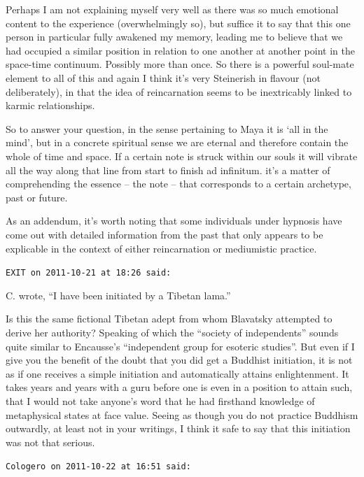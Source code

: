 \begin{footnotesize}
\begin{sffamily}
Perhaps I am not explaining myself very well as there was so much emotional content to the experience (overwhelmingly so), but suffice it to say that this one person in particular fully awakened my memory, leading me to believe that we had occupied a similar position in relation to one another at another point in the space-time continuum. Possibly more than once. So there is a powerful soul-mate element to all of this and again I think it's very Steinerish in flavour (not deliberately), in that the idea of reincarnation seems to be inextricably linked to karmic relationships.

So to answer your question, in the sense pertaining to Maya it is `all in the mind', but in a concrete spiritual sense we are eternal and therefore contain the whole of time and space. If a certain note is struck within our souls it will vibrate all the way along that line from start to finish ad infinitum. it's a matter of comprehending the essence -- the note -- that corresponds to a certain archetype, past or future.

As an addendum, it's worth noting that some individuals under hypnosis have come out with detailed information from the past that only appears to be explicable in the context of either reincarnation or mediumistic practice.

\hfill

\texttt{EXIT on 2011-10-21 at 18:26 said:}

C. wrote, ``I have been initiated by a Tibetan lama.''

Is this the same fictional Tibetan adept from whom Blavatsky attempted to derive her authority? Speaking of which the ``society of independents'' sounds quite similar to Encausse's ``independent group for esoteric studies''. But even if I give you the benefit of the doubt that you did get a Buddhist initiation, it is not as if one receives a simple initiation and automatically attains enlightenment. It takes years and years with a guru before one is even in a position to attain such, that I would not take anyone's word that he had firsthand knowledge of metaphysical states at face value. Seeing as though you do not practice Buddhism outwardly, at least not in your writings, I think it safe to say that this initiation was not that serious.

\hfill

\texttt{Cologero on 2011-10-22 at 16:51 said:}


\end{sffamily}
\end{footnotesize}
